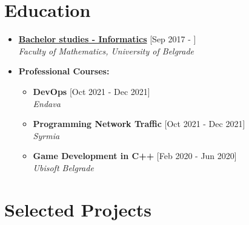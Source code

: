 \documentclass[a4paper]{moderncv}
\begin{document}
\makecvtitle
\vspace{-2em}



\section{Education}

\begin{itemize}

	\item \textbf{\href{http://www.matf.bg.ac.rs/eng/m/94/osnovne-informatics/}{Bachelor studies - Informatics}} \hfill [Sep 2017 - ]\\
	\textit{Faculty of Mathematics, University of Belgrade}				
	
	\item \textbf{Professional Courses:}
	\vspace{-0.5em}
	\begin{itemize}
		\setlength\itemsep{0.5pt}
		\item \textbf{DevOps} \hfill[Oct 2021 - Dec 2021]\\
		\small\textit{Endava}\normalsize

		\item \textbf{Programming Network Traffic} \hfill[Oct 2021 - Dec 2021]\\
		\small\textit{Syrmia}\normalsize

		\item \textbf{Game Development in C++} \hfill[Feb 2020 - Jun 2020]\\
		\small\textit{Ubisoft Belgrade}\normalsize
	\end{itemize}
	
\end{itemize}


\section{Selected Projects}	
\end{document}
